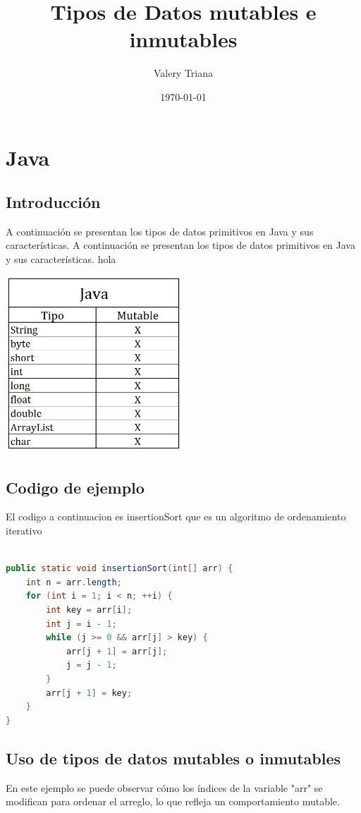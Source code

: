 \documentclass{article}
\title{Tipos de Datos mutables e inmutables}
\author{Valery Triana}
\date{\today} %
\begin{document}
\maketitle

\section{Java}

\subsection{Introducción}
A continuación se presentan los tipos de datos primitivos en Java y sus características.
A continuación se presentan los tipos de datos primitivos en Java y sus características.
hola

\includegraphics[width=0.5\textwidth]{javaTabla.jpg} %

\subsection{Codigo de ejemplo}

El codigo a continuacion es insertionSort que es un algoritmo de ordenamiento iterativo

\begin{lstlisting}[language=Java, caption=Ejemplo de código en Java]

public static void insertionSort(int[] arr) {
    int n = arr.length;
    for (int i = 1; i < n; ++i) {
        int key = arr[i];
        int j = i - 1;
        while (j >= 0 && arr[j] > key) {
            arr[j + 1] = arr[j];
            j = j - 1;
        }
        arr[j + 1] = key;
    }
}
\end{lstlisting}
\subsection{Uso de tipos de datos mutables o inmutables}
En este ejemplo se puede observar cómo los índices de la variable "arr" se modifican para ordenar el arreglo, lo que refleja un comportamiento mutable.
\end{document}
